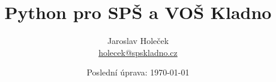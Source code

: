 \documentclass[10pt,a4paper]{article}
\author{Jaroslav Holeček\\ \href{mailto:holecek@spskladno.cz}{holecek@spskladno.cz}}
\title{Python pro SPŠ a VOŠ Kladno}
\date{Poslední úprava: \today}
\begin{document}
\doclicenseThis
\maketitle
\tableofcontents









\end{document}
